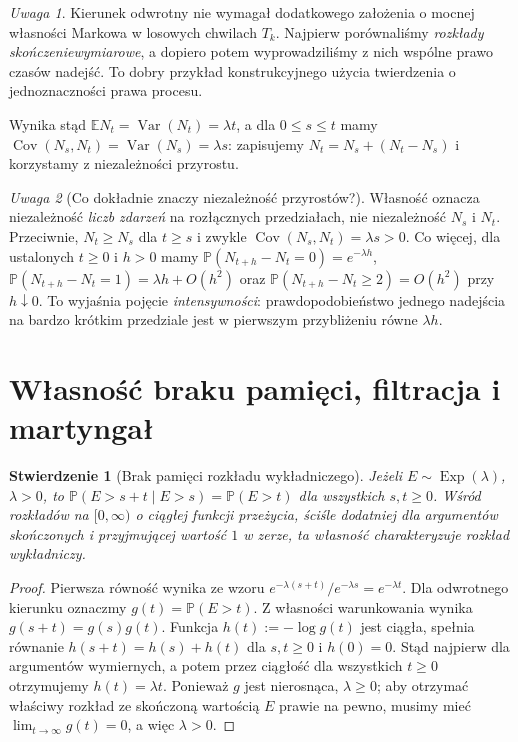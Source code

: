\documentclass[11pt,a4paper,oneside]{report}
\numberwithin{equation}{chapter}
\theoremstyle{plain}
\newtheorem{stwierdzenie}[twierdzenie]{Stwierdzenie}
\theoremstyle{definition}
\theoremstyle{remark}
\newtheorem{uwaga}{Uwaga}[chapter]
\newcommand{\Prob}{\mathbb{P}}
\newcommand{\E}{\mathbb{E}}
\newcommand{\Var}{\operatorname{Var}}
\newcommand{\Cov}{\operatorname{Cov}}
\begin{document}
\begin{uwaga}
Kierunek odwrotny nie wymagał dodatkowego założenia o
mocnej własności Markowa w losowych chwilach $T_k$.
Najpierw porównaliśmy \emph{rozkłady skończeniewymiarowe},
a dopiero potem wyprowadziliśmy z nich wspólne prawo
czasów nadejść. To dobry przykład konstrukcyjnego
użycia twierdzenia o jednoznaczności prawa procesu.
\end{uwaga}

Wynika stąd $\E N_t=\Var(N_t)=\lambda t$,
a dla $0\le s\le t$ mamy
$\Cov(N_s,N_t)=\Var(N_s)=\lambda s$: zapisujemy
$N_t=N_s+(N_t-N_s)$ i korzystamy z niezależności przyrostu.

\begin{uwaga}[Co dokładnie znaczy niezależność przyrostów?]
Własność oznacza niezależność \emph{liczb zdarzeń} na rozłącznych
przedziałach, nie niezależność $N_s$ i $N_t$. Przeciwnie,
$N_t\ge N_s$ dla $t\ge s$ i zwykle
$\Cov(N_s,N_t)=\lambda s>0$. Co więcej, dla ustalonych
$t\ge0$ i $h>0$ mamy
$\Prob(N_{t+h}-N_t=0)=e^{-\lambda h}$,
$\Prob(N_{t+h}-N_t=1)=\lambda h+O(h^2)$
oraz $\Prob(N_{t+h}-N_t\ge2)=O(h^2)$ przy $h\downarrow0$.
To wyjaśnia pojęcie \emph{intensywności}: prawdopodobieństwo
jednego nadejścia na bardzo krótkim przedziale jest w pierwszym
przybliżeniu równe $\lambda h$.
\end{uwaga}

\section{Własność braku pamięci, filtracja i martyngał}
\begin{stwierdzenie}[Brak pamięci rozkładu wykładniczego]
Jeżeli $E\sim\operatorname{Exp}(\lambda)$, $\lambda>0$, to
$\Prob(E>s+t\mid E>s)=\Prob(E>t)$ dla wszystkich $s,t\ge0$.
Wśród rozkładów na $[0,\infty)$ o ciągłej funkcji przeżycia,
ściśle dodatniej dla argumentów skończonych i przyjmującej wartość
$1$ w zerze, ta własność charakteryzuje rozkład wykładniczy.
\end{stwierdzenie}
\begin{proof}
Pierwsza równość wynika ze wzoru
$e^{-\lambda(s+t)}/e^{-\lambda s}=e^{-\lambda t}$.
Dla odwrotnego kierunku oznaczmy $g(t)=\Prob(E>t)$.
Z własności warunkowania wynika $g(s+t)=g(s)g(t)$.
Funkcja $h(t):=-\log g(t)$ jest ciągła, spełnia równanie
$h(s+t)=h(s)+h(t)$ dla $s,t\ge0$ i $h(0)=0$.
Stąd najpierw dla argumentów wymiernych, a potem przez ciągłość
dla wszystkich $t\ge0$ otrzymujemy $h(t)=\lambda t$.
Ponieważ $g$ jest nierosnąca, $\lambda\ge0$; aby otrzymać
właściwy rozkład ze skończoną wartością $E$ prawie na pewno,
musimy mieć $\lim_{t\to\infty}g(t)=0$, a więc $\lambda>0$.
\end{proof}
\end{document}
